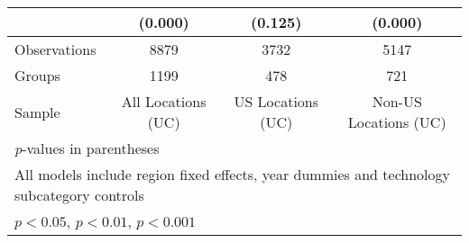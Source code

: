 {\begin{longtable}{l*{3}{c}}
                &  (0.000)         &  (0.125)         &  (0.000)         \\
\hline
Observations    &     8879         &     3732         &     5147         \\
Groups          &     1199         &      478         &      721         \\
Sample          &All Locations (UC)         &US Locations (UC)         &Non-US Locations (UC)         \\
\hline\hline
\multicolumn{4}{l}{\footnotesize \textit{p}-values in parentheses}\\
\multicolumn{4}{l}{\footnotesize All models include region fixed effects, year dummies and technology subcategory controls}\\
\multicolumn{4}{l}{\footnotesize \sym{*} \(p<0.05\), \sym{**} \(p<0.01\), \sym{***} \(p<0.001\)}\\
\end{longtable}
}
